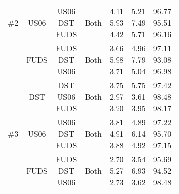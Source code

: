 \begin{table*}[htbp]
{\begin{tabular}{ c c c c c c c }
    \#2%
     & US06 & \makecell{US06\\DST\\FUDS} & Both 
                                & \makecell{4.11\\5.93\\4.42} & \makecell{5.21\\7.49\\5.71} & \makecell{96.77\\95.51\\96.16} \\
     & FUDS & \makecell{FUDS\\DST\\US06} & Both 
                                & \makecell{3.66\\5.98\\3.71} & \makecell{4.96\\7.79\\5.04} & \makecell{97.11\\93.08\\96.98} \\ %
    \hline
     & DST  & \makecell{DST\\US06\\FUDS} & Both 
                                & \makecell{3.75\\2.97\\3.20} & \makecell{5.75\\3.61\\3.95} & \makecell{97.42\\98.48\\98.17} \\
    \#3%
     & US06 & \makecell{US06\\DST\\FUDS} & Both 
                                & \makecell{3.81\\4.91\\3.88} & \makecell{4.89\\6.14\\4.92} & \makecell{97.22\\95.70\\97.15} \\
     & FUDS & \makecell{FUDS\\DST\\US06} & Both 
                                & \makecell{2.70\\5.27\\2.73} & \makecell{3.54\\6.93\\3.62} & \makecell{95.69\\94.52\\98.48} \\ %
    \hline\hline
\end{tabular}
}
\end{table*}

